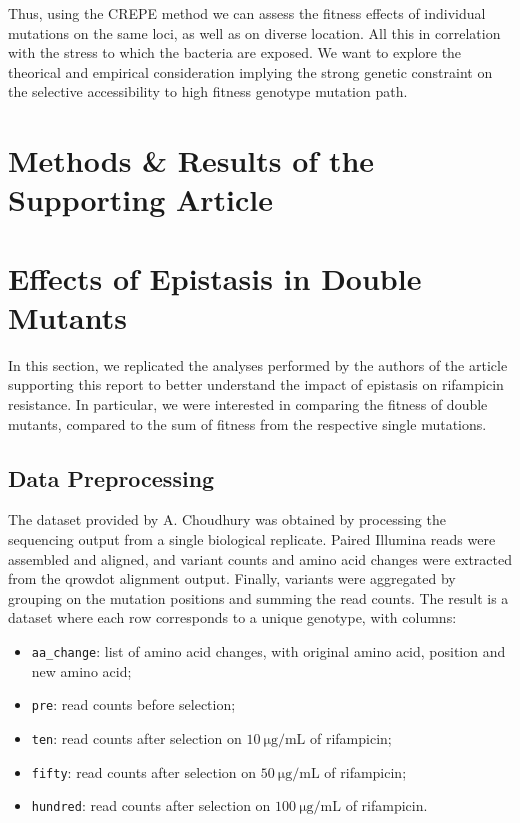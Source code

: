 \documentclass[12pt]{article}
\begin{document}
  Thus, using the CREPE method we can assess the fitness effects of individual
  mutations on the same loci, as well as on diverse location. All this in
  correlation with the stress to which the bacteria are exposed. We want to
  explore the theorical and empirical consideration implying the strong genetic
  constraint on the selective accessibility to high fitness genotype mutation
  path.

  \section*{Methods \& Results of the Supporting Article}

  \section*{Effects of Epistasis in Double Mutants}

  In this section, we replicated the analyses performed by the authors of the
  article supporting this report to better understand the impact of epistasis
  on rifampicin resistance. In particular, we were interested in comparing the
  fitness of double mutants, compared to the sum of fitness from the respective
  single mutations.

  \subsection*{Data Preprocessing}

  The dataset provided by A. Choudhury was obtained by processing the
  sequencing output from a single biological replicate. Paired Illumina reads
  were assembled and aligned, and variant counts and amino acid changes were
  extracted from the qrowdot alignment output. Finally, variants were
  aggregated by grouping on the mutation positions and summing the read counts.
  The result is a dataset where each row corresponds to a unique genotype, with
  columns:
  \begin{itemize}
    \item \lstinline{aa_change}: list of amino acid changes, with original
      amino acid, position and new amino acid;
    \item \lstinline{pre}: read counts before selection;
    \item \lstinline{ten}: read counts after selection on 
      $\SI{10}{\micro\gram\per\milli\liter}$ of rifampicin;
    \item \lstinline{fifty}: read counts after selection on 
      $\SI{50}{\micro\gram\per\milli\liter}$ of rifampicin; 
    \item \lstinline{hundred}: read counts after selection on 
      $\SI{100}{\micro\gram\per\milli\liter}$ of rifampicin. 
  \end{itemize}
\end{document}
